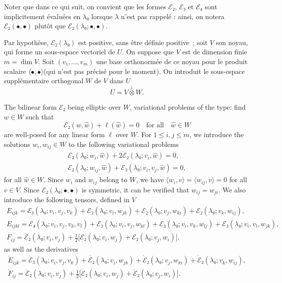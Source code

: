 \documentclass[12pt, final]{scrartcl}
\theoremstyle{definition}
\begin{document}
Noter que dans ce qui suit, on convient que les formes \(ℰ₂\), \(ℰ₃\) et \(ℰ₄\)
sont implicitement évaluées en \(λ₀\) lorsque \(λ\) n'est pas rappelé : ainsi,
on notera \(ℰ₂(•, •)\) plutôt que \(ℰ₂(λ₀ ; •, •)\).

Par hypothèse, \(ℰ₂(λ₀)\) est positive, sans être définie
positive~; soit \(V\) son noyau, qui forme un sous-espace vectoriel de \(U\). On
suppose que \(V\) est de dimension finie \(m = \dim V\). Soit
\((v₁, \ldots, v_m)\) une base orthonormée de ce noyau pour le produit scalaire
\(〈 •, • 〉\)(qui n'est pas précisé pour le moment). On introduit le
sous-espace supplémentaire orthogonal \(W\) de \(V\) dans \(U\)
\begin{equation}
  U = V \overset{\perp}{\otimes} W.
\end{equation}

The bilinear form \(ℰ₂\) being elliptic over \(W\), variational problems of the
type: find \(w ∈ W\) such that
\begin{equation}
  ℰ₂(w, \hat{w})+\ell(\hat{w}) = 0 \quad \text{for all} \quad \hat{w}∈W
\end{equation}
are well-posed for any linear form \(\ell\) over \(W\). For \(1 ≤ i, j ≤ m\), we
introduce the solutions \(w_i, w_{ij} ∈ W\) to the following variational
problems
\begin{gather}
  \label{eq:20220524134525}
  ℰ₂(λ₀; w_i, \hat{w}) + 2\dot{ℰ}₂(λ₀; v_i, \hat{w}) = 0,\\
  \label{eq:20220519164523}
  ℰ₂(λ₀; w_{i j}, \hat{w})+ℰ₃(λ₀; v_i, v_j, \hat{w}) = 0,
\end{gather}
for all \(\hat{w} ∈ W\). Since \(w_{i}\) and \(w_{ij}\) belong to \(W\), we have
\(〈 w_{i}, v 〉 = 〈 w_{ij}, v 〉 = 0\) for all \(v ∈ V\). Since \(ℰ₂(λ₀; •,
•)\) is symmetric, it can be verified that \(w_{ij}=w_{ji}\). We also introduce
the following tensors, defined in \(V\)
\begin{gather}
  E_{ijk} = ℰ₃(λ₀; v_i, v_j, v_k) + ℰ₂(λ₀; v_i, w_{jk}) + ℰ₂(λ₀; v_j, w_{ki}) + ℰ₂(λ₀; v_k, w_{ij}),\\
  E_{ijkl} = ℰ₄(λ₀ ; v_i, v_j, v_k, v_l) + ℰ₃(λ₀ ; v_i, v_j, w_{kl}) + ℰ₃(λ₀ ; v_i, v_k, w_{lj}) + ℰ₃(λ₀ ; v_i, v_l, w_{jk}),\\
  F_{ij} = \dot{ℰ}₂(λ₀; v_i, v_j) + \tfrac{1}{2} \bigl[ℰ₂(λ₀; v_i, w_j) + ℰ₂(λ₀; v_j, w_i)\bigr],
\end{gather}
as well as the derivatives
\begin{gather}
  \label{eq:20220615063626}
  \mathring{E}_{ijk} = \dot{ℰ}₃(λ₀; v_i, v_j, v_k) + \dot{ℰ₂}(λ₀; v_i, w_{jk}) + \dot{ℰ}₂(λ₀; v_j, w_{ki}) + \dot{ℰ}₂(λ₀; v_k, w_{ij}),\\
  \label{eq:20220615063633}
  \mathring{F}_{ij} = \ddot{ℰ}₂(λ₀; v_i, v_j) + \tfrac{1}{2} \bigl[\dot{ℰ}₂(λ₀; v_i, w_j) + \dot{ℰ}₂(λ₀; v_j, w_i)\bigr].
\end{gather}
\end{document}
